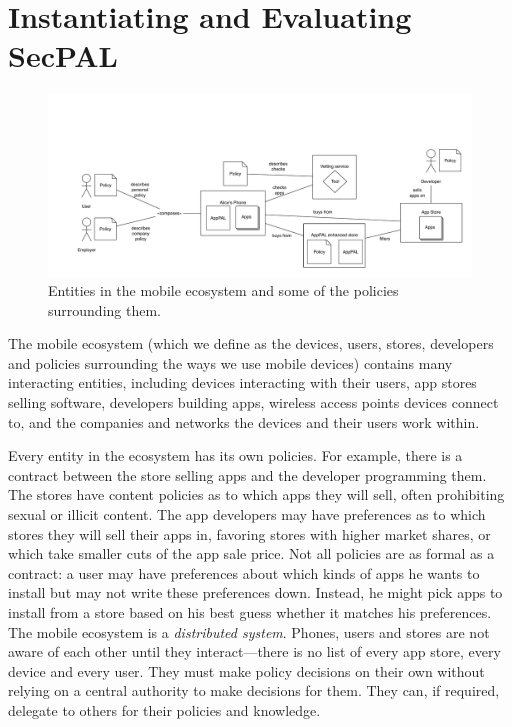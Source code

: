\documentclass[thesis.tex]{subfiles}
\begin{document}
\chapter{Instantiating and Evaluating SecPAL}
\label{chap:apppal}

\begin{figure}
  \centering\noindent
  \includegraphics[width=\textwidth]{figures/policies-ecosystem.pdf}
  \medskip
  \caption[Entities in the mobile ecosystem]{Entities in the mobile ecosystem
    and some of the policies surrounding them.}
  \label{fig:ecosystem}
\end{figure}

The mobile ecosystem (which we define as the devices, users, stores,
developers and policies surrounding the ways we use mobile devices)
contains many interacting entities, including devices interacting with
their users, app stores selling software, developers building apps,
wireless access points devices connect to, and the companies and
networks the devices and their users work within.

Every entity in the ecosystem has its own policies. For example, there
is a contract between the store selling apps and the developer
programming them. The stores have content policies as to which apps
they will sell, often prohibiting sexual or illicit content. The app
developers may have preferences as to which stores they will sell
their apps in, favoring stores with higher market shares, or which
take smaller cuts of the app sale price. Not all policies are as
formal as a contract: a user may have preferences about which kinds of
apps he wants to install but may not write these preferences down.
Instead, he might pick apps to install from a store based on his best
guess whether it matches his preferences. The mobile ecosystem is a
\emph{distributed system}. Phones, users and stores are not aware of
each other until they interact---there is no list of every app store,
every device and every user.  They must make policy decisions on their
own without relying on a central authority to make decisions for
them. They can, if required, delegate to others for their policies and
knowledge.
\end{document}
